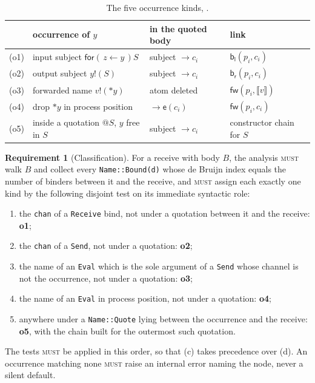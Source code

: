 \documentclass[11pt,a4paper]{article}
\makeatletter
\newcommand{\code}[1]{\texttt{#1}}
\newcommand{\MUST}{\textsc{must}}
\newcommand{\quo}[1]{@#1}
\newcommand{\drp}[1]{{*}#1}
\newcommand{\inp}[3]{\mathsf{for}(\,#1 \leftarrow #2\,)#3}
\newcommand{\out}[2]{#1!(#2)}
\newcommand{\enc}[1]{\llbracket #1 \rrbracket}
\newcommand{\fw}{\mathsf{fw}}
\newcommand{\bl}{\mathsf{b}_{\mathsf{l}}}
\newcommand{\br}{\mathsf{b}_{\mathsf{r}}}
\newcommand{\ev}{\mathsf{e}}
\theoremstyle{definition}
\newtheorem{requirement}[definition]{Requirement}
\theoremstyle{plain}
\makeatother
\begin{document}
\begin{table}[t]
\centering
\begin{tabularx}{\linewidth}{@{}llX l@{}}
\toprule
 & occurrence of $y$ & in the quoted body & link\\
\midrule
(o1) & input subject $\inp{z}{y}{S}$ & subject $\to c_{i}$ & $\bl(p_{i},c_{i})$\\
(o2) & output subject $\out{y}{S}$ & subject $\to c_{i}$ & $\br(p_{i},c_{i})$\\
(o3) & forwarded name $\out{v}{\drp{y}}$ & atom deleted & $\fw(p_{i},\enc{v})$\\
(o4) & drop $\drp{y}$ in process position & $\to \ev(c_{i})$ & $\fw(p_{i},c_{i})$\\
(o5) & inside a quotation $\quo{S}$, $y$ free in $S$ & subject $\to c_{i}$
     & constructor chain for $S$\\
\bottomrule
\end{tabularx}
\caption{The five occurrence kinds, \cite[Table~1]{draft3}.}
\label{tab:links}
\end{table}

\begin{requirement}[Classification]\label{req:classify}
For a receive with body $B$, the analysis \MUST{} walk $B$ and collect every
\code{Name::Bound(d)} whose de Bruijn index equals the number of binders
between it and the receive, and \MUST{} assign each exactly one kind by the
following disjoint test on its immediate syntactic role:
\begin{enumerate}[leftmargin=1.6em, label=(\alph*)]
\item the \code{chan} of a \code{Receive} bind, not under a quotation between
it and the receive: \textbf{o1};
\item the \code{chan} of a \code{Send}, not under a quotation: \textbf{o2};
\item the name of an \code{Eval} which is the sole argument of a \code{Send}
whose channel is not the occurrence, not under a quotation: \textbf{o3};
\item the name of an \code{Eval} in process position, not under a quotation:
\textbf{o4};
\item anywhere under a \code{Name::Quote} lying between the occurrence and the
receive: \textbf{o5}, with the chain built for the outermost such quotation.
\end{enumerate}
The tests \MUST{} be applied in this order, so that (c) takes precedence over
(d). An occurrence matching none \MUST{} raise an internal error naming the
node, never a silent default.
\end{requirement}
\end{document}
